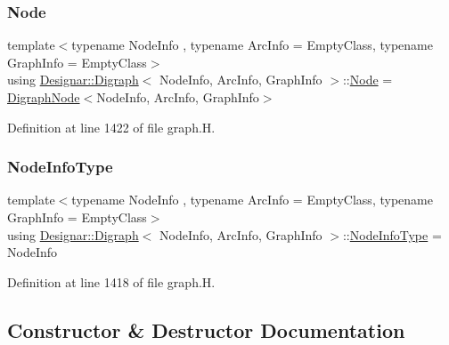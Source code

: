 \subsubsection{\texorpdfstring{Node}{Node}}
{\footnotesize\ttfamily template$<$typename Node\+Info , typename Arc\+Info  = Empty\+Class, typename Graph\+Info  = Empty\+Class$>$ \\
using \hyperlink{class_designar_1_1_digraph}{Designar\+::\+Digraph}$<$ Node\+Info, Arc\+Info, Graph\+Info $>$\+::\hyperlink{class_designar_1_1_digraph_a4dc921c41a480b7946a04170e997d8ae}{Node} =  \hyperlink{class_designar_1_1_digraph_node}{Digraph\+Node}$<$Node\+Info, Arc\+Info, Graph\+Info$>$}



Definition at line 1422 of file graph.\+H.

\mbox{\label{class_designar_1_1_digraph_a6438608ff27cb6f017705e18bd7fc478}} 
\subsubsection{\texorpdfstring{Node\+Info\+Type}{NodeInfoType}}
{\footnotesize\ttfamily template$<$typename Node\+Info , typename Arc\+Info  = Empty\+Class, typename Graph\+Info  = Empty\+Class$>$ \\
using \hyperlink{class_designar_1_1_digraph}{Designar\+::\+Digraph}$<$ Node\+Info, Arc\+Info, Graph\+Info $>$\+::\hyperlink{class_designar_1_1_digraph_a6438608ff27cb6f017705e18bd7fc478}{Node\+Info\+Type} =  Node\+Info}



Definition at line 1418 of file graph.\+H.



\subsection{Constructor \& Destructor Documentation}
\mbox{\label{class_designar_1_1_digraph_ae57ac8513bfcb29602cc08a3d4bc7485}} 
